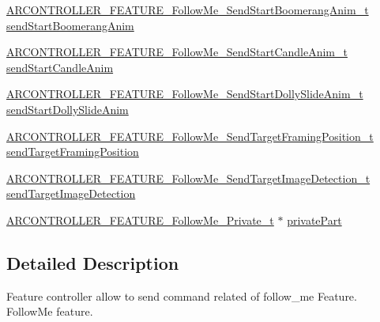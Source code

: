 \begin{DoxyCompactItemize}
\item 
\hyperlink{_a_r_c_o_n_t_r_o_l_l_e_r___feature_8h_a6451e527a96fe2465665b9055d955e74}{A\+R\+C\+O\+N\+T\+R\+O\+L\+L\+E\+R\+\_\+\+F\+E\+A\+T\+U\+R\+E\+\_\+\+Follow\+Me\+\_\+\+Send\+Start\+Boomerang\+Anim\+\_\+t} \hyperlink{struct_a_r_c_o_n_t_r_o_l_l_e_r___f_e_a_t_u_r_e___follow_me__t_a6050ac3bc6fd47216f8a0ba74e5b8c27}{send\+Start\+Boomerang\+Anim}
\item 
\hyperlink{_a_r_c_o_n_t_r_o_l_l_e_r___feature_8h_a4b8c7c6a50bb52fbb60291f4fd35f335}{A\+R\+C\+O\+N\+T\+R\+O\+L\+L\+E\+R\+\_\+\+F\+E\+A\+T\+U\+R\+E\+\_\+\+Follow\+Me\+\_\+\+Send\+Start\+Candle\+Anim\+\_\+t} \hyperlink{struct_a_r_c_o_n_t_r_o_l_l_e_r___f_e_a_t_u_r_e___follow_me__t_a9f7306ed29002055551b60aa52eea117}{send\+Start\+Candle\+Anim}
\item 
\hyperlink{_a_r_c_o_n_t_r_o_l_l_e_r___feature_8h_a3eb336a707290bb38f0d0f99ea3dc641}{A\+R\+C\+O\+N\+T\+R\+O\+L\+L\+E\+R\+\_\+\+F\+E\+A\+T\+U\+R\+E\+\_\+\+Follow\+Me\+\_\+\+Send\+Start\+Dolly\+Slide\+Anim\+\_\+t} \hyperlink{struct_a_r_c_o_n_t_r_o_l_l_e_r___f_e_a_t_u_r_e___follow_me__t_aac0adea5f6e3296628da17ba5d34c194}{send\+Start\+Dolly\+Slide\+Anim}
\item 
\hyperlink{_a_r_c_o_n_t_r_o_l_l_e_r___feature_8h_a9667c5af99db16673f5201b25c61e6fc}{A\+R\+C\+O\+N\+T\+R\+O\+L\+L\+E\+R\+\_\+\+F\+E\+A\+T\+U\+R\+E\+\_\+\+Follow\+Me\+\_\+\+Send\+Target\+Framing\+Position\+\_\+t} \hyperlink{struct_a_r_c_o_n_t_r_o_l_l_e_r___f_e_a_t_u_r_e___follow_me__t_a2124f4db41a04b9ecdc545ce6e4f2b90}{send\+Target\+Framing\+Position}
\item 
\hyperlink{_a_r_c_o_n_t_r_o_l_l_e_r___feature_8h_a22c5d09e22e953c075186494f6568817}{A\+R\+C\+O\+N\+T\+R\+O\+L\+L\+E\+R\+\_\+\+F\+E\+A\+T\+U\+R\+E\+\_\+\+Follow\+Me\+\_\+\+Send\+Target\+Image\+Detection\+\_\+t} \hyperlink{struct_a_r_c_o_n_t_r_o_l_l_e_r___f_e_a_t_u_r_e___follow_me__t_ac6499ceaca21d550b23a06edf24c740b}{send\+Target\+Image\+Detection}
\item 
\hyperlink{_a_r_c_o_n_t_r_o_l_l_e_r___feature_8h_ae939e7d98f0171f3a544dff3329e01e1}{A\+R\+C\+O\+N\+T\+R\+O\+L\+L\+E\+R\+\_\+\+F\+E\+A\+T\+U\+R\+E\+\_\+\+Follow\+Me\+\_\+\+Private\+\_\+t} $\ast$ \hyperlink{struct_a_r_c_o_n_t_r_o_l_l_e_r___f_e_a_t_u_r_e___follow_me__t_a546030df20586c990aaa3661589be641}{private\+Part}
\end{DoxyCompactItemize}


\subsection{Detailed Description}
Feature controller allow to send command related of follow\+\_\+me Feature. Follow\+Me feature. 

